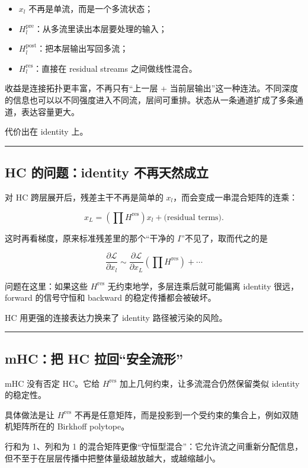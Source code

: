 \begin{itemize}
  \item \(x_l\) 不再是单流，而是一个多流状态；
  \item \(H_l^{\mathrm{pre}}\)：从多流里读出本层要处理的输入；
  \item \(H_l^{\mathrm{post}}\)：把本层输出写回多流；
  \item \(H_l^{\mathrm{res}}\)：直接在 residual streams 之间做线性混合。
\end{itemize}

收益是连接拓扑更丰富，不再只有“上一层 + 当前层输出”这一种连法。不同深度的信息也可以以不同强度进入不同流，层间可重排。状态从一条通道扩成了多条通道，表达容量更大。

代价出在 identity 上。

\hrule

\subsection{HC 的问题：identity 不再天然成立}

对 HC 跨层展开后，残差主干不再是简单的 \(x_l\)，而会变成一串混合矩阵的连乘：

\[
x_L
=
\left(\prod H^{\mathrm{res}}\right)x_l
+
\text{(residual terms)}.
\]

这时再看梯度，原来标准残差里的那个“干净的 \(I\)”不见了，取而代之的是

\[
\frac{\partial \mathcal L}{\partial x_l}
\sim
\frac{\partial \mathcal L}{\partial x_L}
\left(\prod H^{\mathrm{res}}\right)
+\cdots
\]

问题在这里：如果这些 \(H^{\mathrm{res}}\) 无约束地学，多层连乘后就可能偏离 identity 很远，forward 的信号守恒和 backward 的稳定传播都会被破坏。

HC 用更强的连接表达力换来了 identity 路径被污染的风险。

\hrule

\subsection{mHC：把 HC 拉回“安全流形”}

mHC 没有否定 HC。它给 \(H^{\mathrm{res}}\) 加上几何约束，让多流混合仍然保留类似 identity 的稳定性。

具体做法是让 \(H^{\mathrm{res}}\) 不再是任意矩阵，而是投影到一个受约束的集合上，例如双随机矩阵所在的 Birkhoff polytope。

行和为 1、列和为 1 的混合矩阵更像“守恒型混合”：它允许流之间重新分配信息，但不至于在层层传播中把整体量级越放越大，或越缩越小。


